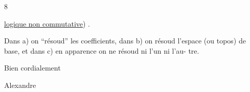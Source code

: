  \hfill 8

\uline{logique non commutative}) .

Dans a)  on ``résoud''  les coefficients, dans  b) on résoud l'espace
(ou topos) de base, et dans c)  en apparence on ne résoud ni l'un ni l'au-%
tre.

Bien cordialement

Alexandre

